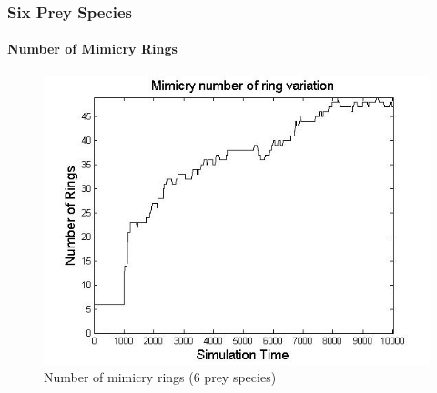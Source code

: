 \frame
{
	\frametitle{Six Prey Species}
	\framesubtitle{Number of Mimicry Rings}

	\begin{figure}[H]
		\centering
		\includegraphics[scale=0.30]{../tex/images/ringSize10k-6Prey}
		\caption{Number of mimicry rings (6 prey species)}
		\label{fig:ringSize10k-6-Prey}
	\end{figure}	
}

